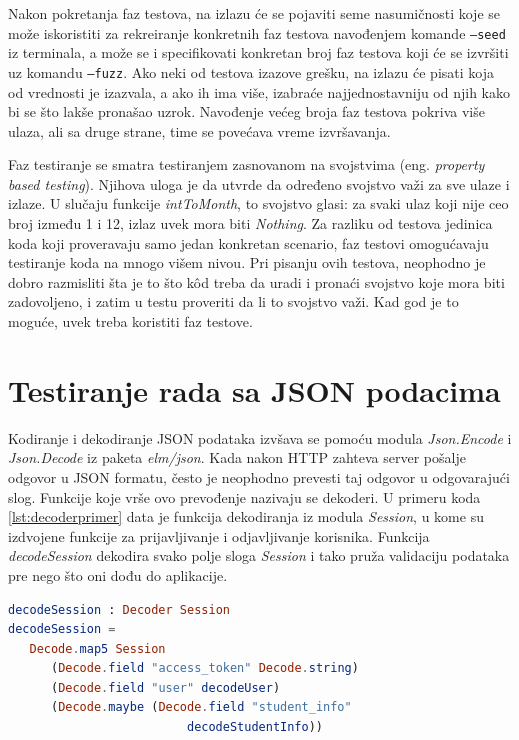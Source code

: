 \documentclass[12pt,oneside]{memoir}
\begin{document}
\par Nakon pokretanja faz testova, na izlazu će se pojaviti seme nasumičnosti koje se može iskoristiti za rekreiranje konkretnih faz testova navođenjem komande \texttt{---seed} iz terminala, a može se i specifikovati konkretan broj faz testova koji će se izvršiti uz komandu \texttt{---fuzz}. Ako neki od testova izazove grešku, na izlazu će pisati koja od vrednosti je izazvala, a ako ih ima više, izabraće najjednostavniju od njih kako bi se što lakše pronašao uzrok. Navođenje većeg broja faz testova pokriva više ulaza, ali sa druge strane, time se povećava vreme izvršavanja. 
\par Faz testiranje se smatra testiranjem zasnovanom na svojstvima (eng. \emph{property based testing}). Njihova uloga je da utvrde da određeno svojstvo važi za sve ulaze i izlaze. U slučaju funkcije \emph{intToMonth}, to svojstvo glasi: za svaki ulaz koji nije ceo broj između 1 i 12, izlaz uvek mora biti \emph{Nothing}. Za razliku od testova jedinica koda koji proveravaju samo jedan konkretan scenario, faz testovi omogućavaju testiranje koda na mnogo višem nivou. Pri pisanju ovih testova, neophodno je dobro razmisliti šta je to što k\^{o}d treba da uradi i pronaći svojstvo koje mora biti zadovoljeno, i zatim u testu proveriti da li to svojstvo važi. Kad god je to moguće, uvek treba koristiti faz testove. 

\section{Testiranje rada sa JSON podacima}
\par Kodiranje i dekodiranje JSON podataka izvšava se pomoću modula \emph{Json.Encode} i \emph{Json.Decode} iz paketa \emph{elm/json}. Kada nakon HTTP zahteva server pošalje odgovor u JSON formatu, često je neophodno prevesti taj odgovor u odgovarajući slog. Funkcije koje vrše ovo prevođenje nazivaju se dekoderi. U primeru koda \ref{lst:decoderprimer} data je funkcija dekodiranja iz modula \emph{Session}, u kome su izdvojene funkcije za prijavljivanje i odjavljivanje korisnika. Funkcija \emph{decodeSession} dekodira svako polje sloga \emph{Session} i tako pruža validaciju podataka pre nego što oni dođu do aplikacije. 

\begin{minipage}{\linewidth}
\begin{lstlisting}[language=elm, basicstyle=\small, caption={Implementacija funkcije dekodiranja \emph{decodeSession}},captionpos=b, label={lst:decoderprimer}]
decodeSession : Decoder Session
decodeSession =
   Decode.map5 Session
      (Decode.field "access_token" Decode.string)
      (Decode.field "user" decodeUser)
      (Decode.maybe (Decode.field "student_info"
      			         decodeStudentInfo))
\end{lstlisting}
\end{minipage}
\end{document}
